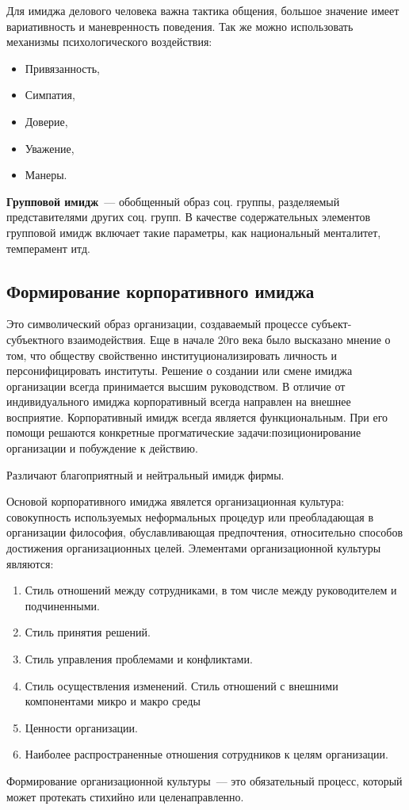 Для имиджа делового человека важна тактика общения, большое значение имеет вариативность и маневренность поведения. Так же можно использовать механизмы психологического воздействия:
\begin{itemize}
	\item Привязанность,
	\item Симпатия,
	\item Доверие,
	\item Уважение,
	\item Манеры.
\end{itemize}

\textbf{Групповой имидж}~--- обобщенный образ соц. группы, разделяемый представителями других соц. групп. В качестве содержательных элементов групповой имидж включает такие параметры, как национальный менталитет, темперамент итд.

\subsection{Формирование корпоративного имиджа}
Это символический образ организации, создаваемый процессе субъект-субъектного взаимодействия. Еще в начале 20го века было высказано мнение о том, что обществу свойственно институционализировать личность и персонифицировать институты. Решение о создании или смене имиджа организации всегда принимается высшим руководством. В отличие от индивидуального имиджа корпоративный всегда направлен на внешнее восприятие. Корпоративный имидж всегда является функциональным. При его помощи решаются конкретные прогматические задачи:позиционирование организации и побуждение к действию.

Различают благоприятный и нейтральный имидж фирмы.

Основой корпоративного имиджа явялется организационная культура: совокупность используемых неформальных процедур или преобладающая в организации философия, обуславливающая предпочтения, относительно способов достижения организационных целей. Элементами организационной культуры являются:
\begin{enumerate}
	\item Стиль отношений между сотрудниками, в том числе между руководителем и подчиненными.
	\item Стиль принятия решений.
	\item Стиль управления проблемами и конфликтами.
	\item Стиль осуществления изменений.
	\itme Стиль отношений с внешними компонентами микро и макро среды
	\item Ценности организации.
	\item Наиболее распространенные отношения сотрудников к целям организации.
\end{enumerate}

Формирование организационной культуры~--- это обязательный процесс, который может протекать стихийно или целенаправленно.